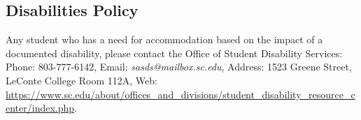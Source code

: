 \documentclass[11pt]{article}
\newcommand{\week}[1]{%
  \paragraph*{\kern-2ex\quad #1, \syldate{\today} - \AdvanceDate[4]\syldate{\today}:}%
  \ifdim\wd1=\wd\MONDAY
    \AdvanceDate[7]
  \else
    \AdvanceDate[7]
  \fi%
}
\begin{document}
\subsection*{Disabilities Policy}

Any student who has a need for accommodation based on the impact of
a documented disability, please contact the Office of Student Disability Services: Phone: 803-777-6142, Email: \textit{sasds@mailbox.sc.edu}, Address: 1523 Greene Street, LeConte College Room 112A, Web: \url{https://www.sc.edu/about/offices_and_divisions/student_disability_resource_center/index.php}.






\end{document}
